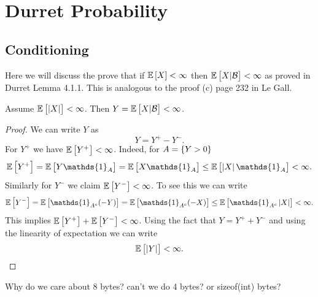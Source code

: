 \chapter{Durret Probability}

\section{Conditioning}

Here we will discuss the prove that if $ \mathbb{E}\left[X\right] < \infty $ then $ \mathbb{E}\left[X|\mathcal{B}\right] < \infty $ as proved in Durret Lemma 4.1.1. This is analogous to the proof (c) page 232 in Le Gall. 
\begin{proposition}
	Assume $ \mathbb{E}\left[|X|\right] < \infty $. Then $ Y = \mathbb{E}\left[X|\mathcal{B}\right] < \infty $.
\end{proposition}
\begin{proof}
	We can write $ Y $ as
	\[ Y = Y^+ - Y^-. \]
	For $ Y^+ $ we have $ \mathbb{E}\left[Y^+\right] < \infty $. Indeed, for $ A = \{Y > 0\} $
	\[ \E{Y^+} = \E{Y\mathds{1}_{A} } = \E{X\mathds{1}_A} \leq \E{\abs{X}\mathds{1}_A} < \infty. \] 
	Similarly for $ Y^- $ we claim $ \mathbb{E}\left[Y^-\right] < \infty $. To see this we can write
	\[ \E{Y^-} = \E{\mathds{1}_{A^c} (-Y)} = \E{\mathds{1}_{A^c} (-X)} \leq \E{\mathds{1}_{A^c}\abs{X}} < \infty. \]
	This implies $ \mathbb{E}\left[Y^+\right] + \mathbb{E}\left[Y^-\right] < \infty $. Using the fact that $ Y = Y^+ + Y^- $ and using the linearity of expectation we can write
	\[ \mathbb{E}\left[\left|Y\right|\right] < \infty. \]
\end{proof}

Why do we care about 8 bytes? can't we do 4 bytes? or sizeof(int) bytes?
